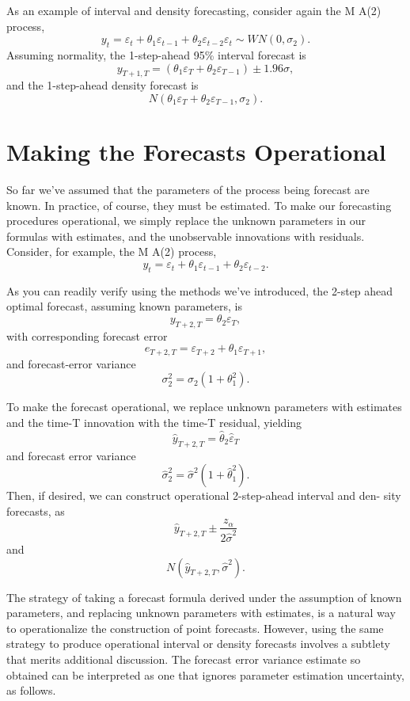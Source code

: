 \documentclass[]{article}
\begin{document}
As an example of interval and density forecasting, consider again the M
A(2) process,
\[y_t = \varepsilon_t + \theta_1 \varepsilon_{t-1} + \theta_2 \varepsilon_{t−2}
\varepsilon_t ∼ W N (0, \sigma_2 ).\] Assuming normality, the
1-step-ahead 95\% interval forecast is
\[y_{T +1,T} = (\theta_1 \varepsilon_T + \theta_2 \varepsilon_{T −1} ) \pm 1.96\sigma ,\]
and the 1-step-ahead density forecast is
\[N (\theta_1 \varepsilon_T + \theta_2 \varepsilon_{T −1} , \sigma_2 ).\]

\hypertarget{making-the-forecasts-operational}{%
\section{Making the Forecasts
Operational}\label{making-the-forecasts-operational}}

So far we've assumed that the parameters of the process being forecast
are known. In practice, of course, they must be estimated. To make our
forecasting procedures operational, we simply replace the unknown
parameters in our formulas with estimates, and the unobservable
innovations with residuals. Consider, for example, the M A(2) process,
\[y_t = \varepsilon_t + \theta_1 \varepsilon_{t-1} + \theta_2 \varepsilon_{t−2} .\]

As you can readily verify using the methods we've introduced, the 2-step
ahead optimal forecast, assuming known parameters, is
\[y_{T +2,T} = \theta_2 \varepsilon _T ,\] with corresponding forecast
error
\[e_{T +2,T} = \varepsilon_{T +2} + \theta_ 1 \varepsilon _{T +1} ,\]
and forecast-error variance
\[\sigma _2^2 = \sigma_2 (1 + \theta_1^2 ).\]

To make the forecast operational, we replace unknown parameters with
estimates and the time-T innovation with the time-T residual, yielding
\[\hat y_{T +2,T} = \hat\theta_2 \hat\varepsilon_T\] and forecast error
variance \[\hat\sigma_2^2 = \hat\sigma^2 (1 + \hat\theta_1^2 ).\] Then,
if desired, we can construct operational 2-step-ahead interval and den-
sity forecasts, as
\[\hat y_{T +2,T} \pm \frac{z_\alpha}{2 \hat\sigma^2}\] and
\[N (\hat y_{T +2,T} ,\hat\sigma^2 ).\]

The strategy of taking a forecast formula derived under the assumption
of known parameters, and replacing unknown parameters with estimates, is
a natural way to operationalize the construction of point forecasts.
However, using the same strategy to produce operational interval or
density forecasts involves a subtlety that merits additional discussion.
The forecast error variance estimate so obtained can be interpreted as
one that ignores parameter estimation uncertainty, as follows.
\end{document}

